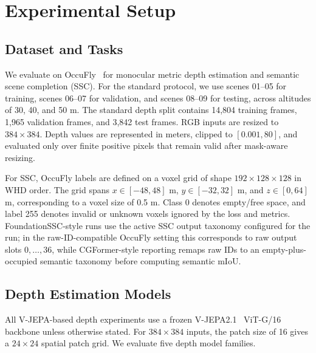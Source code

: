 
\section{Experimental Setup}

\subsection{Dataset and Tasks}
We evaluate on OccuFly~\cite{gross2026occufly} for monocular metric depth estimation and semantic scene completion (SSC). 
For the standard protocol, we use scenes 01--05 for training, scenes 06--07 for validation, and scenes 08--09 for testing, across altitudes of 30, 40, and 50 m. 
The standard depth split contains 14,804 training frames, 1,965 validation frames, and 3,842 test frames. 
RGB inputs are resized to $384 \times 384$. 
Depth values are represented in meters, clipped to $[0.001,80]$, and evaluated only over finite positive pixels that remain valid after mask-aware resizing.

For SSC, OccuFly labels are defined on a voxel grid of shape $192 \times 128 \times 128$ in WHD order. 
The grid spans $x\in[-48,48]$ m, $y\in[-32,32]$ m, and $z\in[0,64]$ m, corresponding to a voxel size of 0.5 m. 
Class 0 denotes empty/free space, and label 255 denotes invalid or unknown voxels ignored by the loss and metrics. 
FoundationSSC-style runs use the active SSC output taxonomy configured for the run; in the raw-ID-compatible OccuFly setting this corresponds to raw output slots $0,\ldots,36$, while CGFormer-style reporting remaps raw IDs to an empty-plus-occupied semantic taxonomy before computing semantic mIoU.

\subsection{Depth Estimation Models}
All V-JEPA-based depth experiments use a frozen V-JEPA2.1~\cite{murlabadia2026vjepa21} ViT-G/16 backbone unless otherwise stated. 
For $384 \times 384$ inputs, the patch size of 16 gives a $24 \times 24$ spatial patch grid. 
We evaluate five depth model families.

